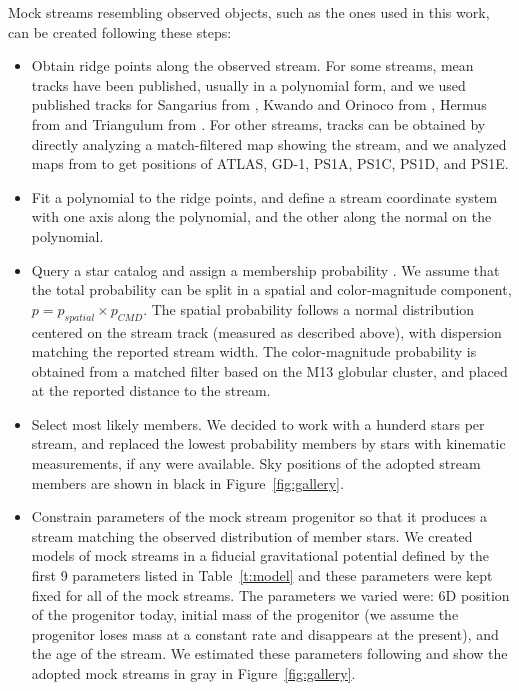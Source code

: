 \documentclass[modern]{aastex61}
\begin{document}
Mock streams resembling observed objects, such as the ones used in this work, can be created following these steps:
\begin{itemize}
\item Obtain ridge points along the observed stream.
For some streams, mean tracks have been published, usually in a polynomial form, and we used published tracks for Sangarius from \citet{grillmair2017a}, Kwando and Orinoco from \citet{grillmair2017b}, Hermus from \citet{grillmair2014} and Triangulum from \citet{bonaca2012}.
For other streams, tracks can be obtained by directly analyzing a match-filtered map showing the stream, and we analyzed maps from \citet{bernard2016} to get positions of ATLAS, GD-1, PS1A, PS1C, PS1D, and PS1E.
 
\item Fit a polynomial to the ridge points, and define a stream coordinate system with one axis along the polynomial, and the other along the normal on the polynomial.

\item Query a star catalog and assign a membership probability \citep[we used PanSTARRS1,][]{ps1,schlafly2012,schlafly2011}.
We assume that the total probability can be split in a spatial and color-magnitude component, $p = p_{spatial} \times p_{CMD}$.
The spatial probability follows a normal distribution centered on the stream track (measured as described above), with dispersion matching the reported stream width.
The color-magnitude probability is obtained from a matched filter based on the M13 globular cluster, and placed at the reported distance to the stream.

\item Select most likely members.
We decided to work with a hunderd stars per stream, and replaced the lowest probability members by stars with kinematic measurements, if any were available.
Sky positions of the adopted stream members are shown in black in Figure~\ref{fig:gallery}.

\item Constrain parameters of the mock stream progenitor so that it produces a stream matching the observed distribution of member stars.
We created models of mock streams in a fiducial gravitational potential defined by the first 9 parameters listed in Table~\ref{t:model} and these parameters were kept fixed for all of the mock streams.
The parameters we varied were: 6D position of the progenitor today, initial mass of the progenitor (we assume the progenitor loses mass at a constant rate and disappears at the present), and the age of the stream.
We estimated these parameters following \citet{bonaca2014} and show the adopted mock streams in gray in Figure~\ref{fig:gallery}.
\end{itemize}
\end{document}
